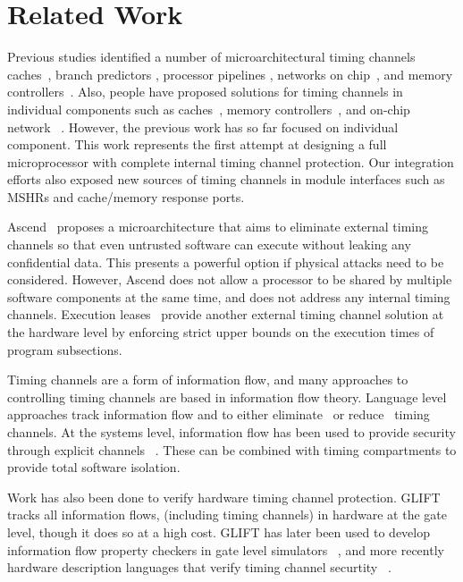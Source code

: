 \section{Related Work}

Previous studies identified 
a number of microarchitectural timing channels 
caches~\cite{percival,bernstein,caseofaes,remoteaes,analyticalcache,collision,
deconstructing,cachegames}, branch predictors 
\cite{branchpred,predictingbranch}, processor
pipelines \cite{pipelines}, networks on chip~\cite{yaonocs,surfnoc}, and memory
controllers~\cite{ushpca14,fletcher-hpca14}. 
Also, people have proposed solutions for timing channels in
individual components such as caches~\cite{newcache,deconstructing}, memory
controllers~\cite{ushpca14,fletcher-hpca14}, and on-chip network
~\cite{yaonocs,surfnoc}.
However, the previous work has
so far focused on individual component. This work represents the first attempt
at designing a full microprocessor with complete internal timing channel protection.
Our integration efforts also exposed new sources of timing channels in module
interfaces such as MSHRs and cache/memory response ports.


Ascend~\cite{ascend} proposes a
microarchitecture that aims to eliminate external timing channels so that
even untrusted software can execute without leaking any confidential
data. This presents a powerful option if physical attacks need to be
considered. However, Ascend does not allow a processor to be shared by
multiple software components at the same time, and does not address 
any internal timing channels.
Execution leases~\cite{execution_leases} 
provide another external timing channel solution at the hardware level by 
enforcing strict upper bounds on the execution times of program subsections. 

Timing channels are a form of information flow, and many approaches to 
controlling timing channels are based in information flow theory. Language 
level approaches track information flow and to either 
eliminate~\cite{quantleaks} or 
reduce~\cite{mitigation1,mitigation2,mitigation3} timing channels. At the 
systems level, information flow has been used to provide security 
through explicit channels ~\cite{flume-sosp07,histar-sosp06,laminar-pldi09}. 
These can be combined with timing compartments to provide total software 
isolation.

Work has also been done to verify hardware timing channel protection. GLIFT 
\cite{glift-asplos09} tracks all information flows, (including timing channels) 
in hardware at the gate level, though it does so at a high cost. GLIFT has 
later been used to develop information flow property checkers in gate level 
simulators ~\cite{glift-dac10,glift-dac11,glift-isca11}, and more recently 
hardware description languages that verify timing channel securtity 
~\cite{caisson-plas10,caisson-pldi11,sapper-plas13}.
